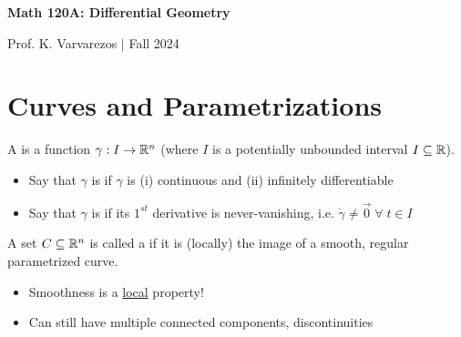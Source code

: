 \documentclass[13pt]{extarticle}
\begin{document}

\begin{center}
    \begin{Large}
        \textbf{Math 120A: Differential Geometry}
    \end{Large}
    
    \begin{large}
        \vspace{8pt}
        Prof. K. Varvarezos $\vert$ Fall 2024
    \end{large}
\end{center}
\tableofcontents

\pagebreak
\section{Curves and Parametrizations}
\begin{tcolorbox}[colback=white]
    \begin{definition}
        A  is a function $\gamma:I\to\mathbb{R}^n$ (where $I$ is  a potentially unbounded interval $I\subseteq\mathbb{R}$). \begin{itemize}
            \item Say that $\gamma$ is  if $\gamma$ is (i) continuous and (ii) infinitely differentiable
            \item Say that $\gamma$ is  if its $1^{st}$ derivative is never-vanishing, i.e. $\dot\gamma\neq\Vec{0}\;\forall\;t\in I$
        \end{itemize}
    \end{definition}
\end{tcolorbox}

\vspace{1pt}
\begin{definition}
    A set $C\subseteq\mathbb{R}^n$ is called a  if it is (locally) the image of a smooth, regular parametrized curve. \begin{itemize}
        \item Smoothness is a \ul{local} property!
        \item Can still have multiple connected components, discontinuities
    \end{itemize}
\end{definition}

\newp
\end{document}
